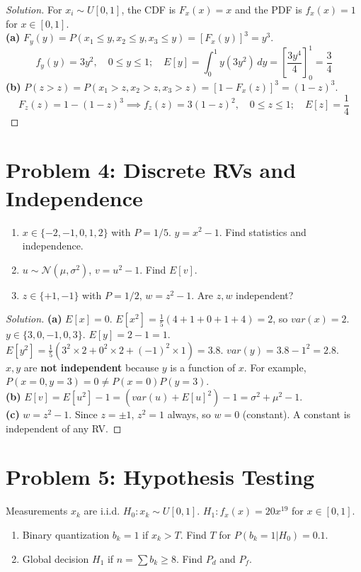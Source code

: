 \documentclass[11pt]{article}
\begin{document}
\begin{proof}[Solution]
For $x_i \sim U[0, 1]$, the CDF is $F_x(x) = x$ and the PDF is $f_x(x) = 1$ for $x \in [0, 1]$. \\
\textbf{(a)} $F_y(y) = P(x_1 \le y, x_2 \le y, x_3 \le y) = [F_x(y)]^3 = y^3$.
\[ f_y(y) = 3y^2, \quad 0 \le y \le 1; \quad E[y] = \int_0^1 y(3y^2) \, dy = \left[ \frac{3y^4}{4} \right]_0^1 = \frac{3}{4} \]
\textbf{(b)} $P(z > z) = P(x_1 > z, x_2 > z, x_3 > z) = [1 - F_x(z)]^3 = (1-z)^3$.
\[ F_z(z) = 1 - (1-z)^3 \implies f_z(z) = 3(1-z)^2, \quad 0 \le z \le 1; \quad E[z] = \frac{1}{4} \]
\end{proof}

\section*{Problem 4: Discrete RVs and Independence}
\begin{enumerate}
    \item[(a)] $x \in \{-2, -1, 0, 1, 2\}$ with $P=1/5$. $y = x^2 - 1$. Find statistics and independence.
    \item[(b)] $u \sim \mathcal{N}(\mu, \sigma^2)$, $v = u^2 - 1$. Find $E[v]$.
    \item[(c)] $z \in \{+1, -1\}$ with $P=1/2$, $w = z^2 - 1$. Are $z, w$ independent?
\end{enumerate}

\begin{proof}[Solution]
\textbf{(a)} $E[x] = 0$. $E[x^2] = \frac{1}{5}(4+1+0+1+4) = 2$, so $var(x) = 2$. \\
$y \in \{3, 0, -1, 0, 3\}$. $E[y] = 2-1 = 1$. $E[y^2] = \frac{1}{5}(3^2 \times 2 + 0^2 \times 2 + (-1)^2 \times 1) = 3.8$. $var(y) = 3.8 - 1^2 = 2.8$. \\
$x, y$ are \textbf{not independent} because $y$ is a function of $x$. For example, $P(x=0, y=3) = 0 \neq P(x=0)P(y=3)$. \\
\textbf{(b)} $E[v] = E[u^2] - 1 = (var(u) + E[u]^2) - 1 = \sigma^2 + \mu^2 - 1$. \\
\textbf{(c)} $w = z^2 - 1$. Since $z = \pm 1$, $z^2 = 1$ always, so $w = 0$ (constant). A constant is independent of any RV.
\end{proof}

\section*{Problem 5: Hypothesis Testing}
Measurements $x_k$ are i.i.d. $H_0: x_k \sim U[0, 1]$. $H_1: f_x(x) = 20x^{19}$ for $x \in [0, 1]$.
\begin{enumerate}
    \item[(a)] Binary quantization $b_k = 1$ if $x_k > T$. Find $T$ for $P(b_k=1|H_0) = 0.1$.
    \item[(b)] Global decision $H_1$ if $n = \sum b_k \ge 8$. Find $P_d$ and $P_f$.
\end{enumerate}
\end{document}
